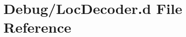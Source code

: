 \hypertarget{Debug_2LocDecoder_8d}{}\section{Debug/\+Loc\+Decoder.d File Reference}
\label{Debug_2LocDecoder_8d}
